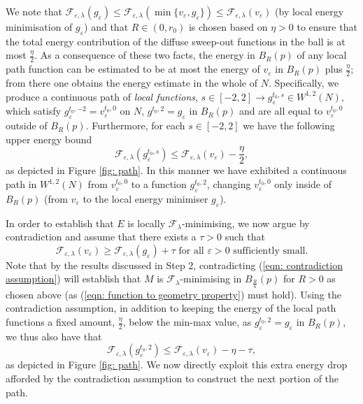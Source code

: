 \documentclass[11pt]{article}
\begin{document}
We note that $\mathcal{F}_{\varepsilon,\lambda}(g_\varepsilon) \leq \mathcal{F}_{\varepsilon,\lambda}(\min\{v_\varepsilon,g_\varepsilon\}) \leq \mathcal{F}_{\varepsilon,\lambda}(v_\varepsilon)$ (by local energy minimisation of $g_\varepsilon$) and that $R \in (0,r_0)$ is chosen based on $\eta > 0$ to ensure that the total energy contribution of the diffuse sweep-out functions in the ball is at most $\frac{\eta}{2}$. As a consequence of these two facts, the energy in $B_R(p)$ of any local path function can be estimated to be at most the energy of $v_\varepsilon$ in $B_R(p)$ plus $\frac{\eta}{2}$; from there one obtains the energy estimate in the whole of $N$. Specifically, we produce a continuous path of \textit{local functions}, $s \in [-2,2] \rightarrow g^{t_0,s}_\varepsilon \in W^{1,2}(N)$, which satisfy $g^{t_0,-2}_\varepsilon = v^{t_0,0}_\varepsilon$ on $N$, $g^{t_0,2} = g_\varepsilon$ in $B_{R}(p)$ and are all equal to $v^{t_0,0}_\varepsilon$ outside of $B_R(p)$. Furthermore, for each $s \in  [-2,2]$ we have the following upper energy bound
\begin{equation*}
    \mathcal{F}_{\varepsilon,\lambda}(g^{t_0,s}_\varepsilon) \leq \mathcal{F}_{\varepsilon,\lambda}(v_\varepsilon) - \frac{\eta}{2},
\end{equation*}
as depicted in Figure \ref{fig: path}. In this manner we have exhibited a continuous path in $W^{1,2}(N)$ from $v^{t_0,0}_\varepsilon$ to a function $g^{t_0,2}_\varepsilon$, changing $v^{t_0,0}_\varepsilon$ only inside of $B_R(p)$ (from $v_\varepsilon$ to the local energy minimiser $g_\varepsilon$).

\bigskip

In order to establish that $E$ is locally $\mathcal{F}_\lambda$-minimising, we now argue by contradiction and assume that there exists a $\tau > 0$ such that
\begin{equation}\label{eqn: contradiction assumption}
\mathcal{F}_{\varepsilon,\lambda}(v_\varepsilon) \geq \mathcal{F}_{\varepsilon,\lambda}(g_\varepsilon) + \tau \text{ for all } \varepsilon > 0 \text{ sufficiently small.}
\end{equation}
Note that by the results discussed in Step 2, contradicting (\ref{eqn: contradiction assumption}) will establish that $M$ is $\mathcal{F}_\lambda$-minimising in $B_{\frac{R}{4}}(p)$ for $R > 0$ as chosen above (as (\ref{eqn: function to geometry property}) must hold). Using the contradiction assumption, in addition to keeping the energy of the local path functions a fixed amount, $\frac{\eta}{2}$, below the min-max value, as $g^{t_0,2}_\varepsilon = g_\varepsilon$ in $B_R(p)$, we thus also have that
\begin{equation*}
    \mathcal{F}_{\varepsilon,\lambda}(g^{t_0,2}_\varepsilon) \leq \mathcal{F}_{\varepsilon,\lambda}(v_\varepsilon) - \eta - \tau,
\end{equation*}
as depicted in Figure \ref{fig: path}. We now directly exploit this extra energy drop afforded by the contradiction assumption to construct the next portion of the path.
\end{document}
